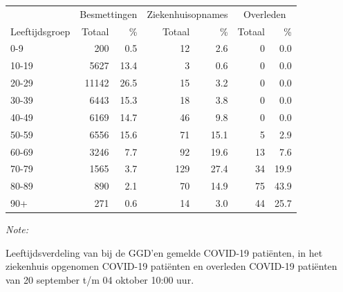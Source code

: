 \documentclass[
  english,
  man,floatsintext]{apa6}
\begin{document}
\begin{table}[H]
\centering\begingroup\fontsize{11}{13}\selectfont

\begin{threeparttable}
\begin{tabular}{lrrrrrr}
\toprule
\multicolumn{1}{c}{ } & \multicolumn{2}{c}{Besmettingen} & \multicolumn{2}{c}{Ziekenhuisopnames} & \multicolumn{2}{c}{Overleden} \\
\cmidrule(l{3pt}r{3pt}){2-3} \cmidrule(l{3pt}r{3pt}){4-5} \cmidrule(l{3pt}r{3pt}){6-7}
Leeftijdsgroep & Totaal & \% & Totaal & \% & Totaal & \%\\
\midrule
0-9 & 200 & 0.5 & 12 & 2.6 & 0 & 0.0\\
10-19 & 5627 & 13.4 & 3 & 0.6 & 0 & 0.0\\
20-29 & 11142 & 26.5 & 15 & 3.2 & 0 & 0.0\\
30-39 & 6443 & 15.3 & 18 & 3.8 & 0 & 0.0\\
40-49 & 6169 & 14.7 & 46 & 9.8 & 0 & 0.0\\
50-59 & 6556 & 15.6 & 71 & 15.1 & 5 & 2.9\\
60-69 & 3246 & 7.7 & 92 & 19.6 & 13 & 7.6\\
70-79 & 1565 & 3.7 & 129 & 27.4 & 34 & 19.9\\
80-89 & 890 & 2.1 & 70 & 14.9 & 75 & 43.9\\
90+ & 271 & 0.6 & 14 & 3.0 & 44 & 25.7\\
\bottomrule
\end{tabular}
\begin{tablenotes}
\item \textit{Note: } 
\item Leeftijdsverdeling van bij de GGD’en gemelde COVID-19 patiënten, in het ziekenhuis opgenomen COVID-19 patiënten en overleden COVID-19 patiënten van 20 september t/m 04 oktober 10:00 uur.
\end{tablenotes}
\end{threeparttable}
\endgroup{}
\end{table}
\end{document}
